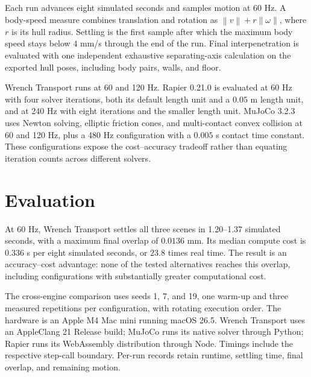 \documentclass[10pt,letterpaper]{article}
\newcommand{\norm}[1]{\left\lVert#1\right\rVert}
\begin{document}
Each run advances eight simulated seconds and samples motion at 60 Hz. A body-speed measure combines translation and rotation as $\norm v+r\norm\omega$, where $r$ is its hull radius. Settling is the first sample after which the maximum body speed stays below $4$ mm/s through the end of the run. Final interpenetration is evaluated with one independent exhaustive separating-axis calculation on the exported hull poses, including body pairs, walls, and floor.

Wrench Transport runs at 60 and 120 Hz. Rapier 0.21.0 is evaluated at 60 Hz with four solver iterations, both its default length unit and a $0.05$ m length unit, and at 240 Hz with eight iterations and the smaller length unit. MuJoCo 3.2.3 uses Newton solving, elliptic friction cones, and multi-contact convex collision at 60 and 120 Hz, plus a 480 Hz configuration with a $0.005$ s contact time constant. These configurations expose the cost--accuracy tradeoff rather than equating iteration counts across different solvers.

\newpage
\section{Evaluation}
At 60 Hz, Wrench Transport settles all three scenes in 1.20--1.37 simulated seconds, with a maximum final overlap of $0.0136$ mm. Its median compute cost is $0.336$ s per eight simulated seconds, or $23.8$ times real time. The result is an accuracy--cost advantage: none of the tested alternatives reaches this overlap, including configurations with substantially greater computational cost.

The cross-engine comparison uses seeds 1, 7, and 19, one warm-up and three measured repetitions per configuration, with rotating execution order. The hardware is an Apple M4 Mac mini running macOS 26.5. Wrench Transport uses an AppleClang 21 Release build; MuJoCo runs its native solver through Python; Rapier runs its WebAssembly distribution through Node. Timings include the respective step-call boundary. Per-run records retain runtime, settling time, final overlap, and remaining motion.
\end{document}
